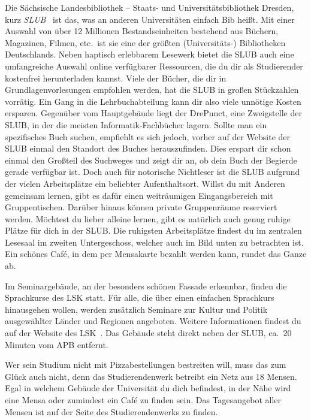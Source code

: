 \label{sec:slub}
Die Sächsische Landesbibliothek – Staats- und Universitätsbibliothek Dresden, kurz \emph{SLUB}~ ist das, was an anderen Universitäten einfach Bib heißt.
Mit einer Auswahl von über 12 Millionen Bestandseinheiten bestehend aus Büchern, Magazinen, Filmen, etc.\ ist sie eine der größten (Universitäts-) Bibliotheken Deutschlands.
Neben haptisch erlebbarem Lesewerk bietet die SLUB auch eine umfangreiche Auswahl online verfügbarer Ressourcen, die du dir als Studierender kostenfrei herunterladen kannst.
Viele der Bücher, die dir in Grundlagenvorlesungen empfohlen werden, hat die SLUB in großen Stückzahlen vorrätig. Ein Gang in die Lehrbuchabteilung kann dir also viele unnötige Kosten ersparen.
Gegenüber vom Hauptgebäude liegt der DrePunct, eine Zweigstelle der SLUB, in der die meisten Informatik-Fachbücher lagern. Sollte man ein spezifisches Buch suchen, empfiehlt es sich jedoch, vorher auf der Website der
SLUB einmal den Standort des Buches herauszufinden. Dies erspart dir schon einmal den Großteil des Suchweges und zeigt dir an, ob dein Buch der Begierde gerade verfügbar ist.\newline
Doch auch für notorische Nichtleser ist die SLUB aufgrund der vielen Arbeitsplätze ein beliebter Aufenthaltsort.
Willst du mit Anderen gemeinsam lernen, gibt es dafür einen weiträumigen Eingangsbereich mit Gruppentischen.
Darüber hinaus können private Gruppenräume reserviert werden. Möchtest du lieber alleine lernen, gibt es natürlich auch genug ruhige Plätze für dich in der SLUB\@. Die ruhigsten Arbeitsplätze findest du im zentralen Lesesaal
im zweiten Untergeschoss, welcher auch im Bild unten zu betrachten ist. Ein schönes Café, in dem per Mensakarte bezahlt werden kann, rundet das Ganze ab.

\newpage
{}
Im Seminargebäude, an der besonders schönen Fassade erkennbar, finden die Sprachkurse des LSK statt.
Für alle, die über einen einfachen Sprachkurs hinausgehen wollen, werden zusätzlich Seminare zur Kultur und Politik ausgewählter Länder und Regionen angeboten.
Weitere Informationen findest du auf der Website des LSK~.
Das Gebäude steht direkt neben der SLUB, ca.\ 20 Minuten vom APB entfernt.

Wer sein Studium nicht mit Pizzabestellungen bestreiten will, muss das zum Glück auch nicht, denn das Studierendenwerk betreibt ein Netz aus 18 Mensen.
Egal in welchem Gebäude der Universität du dich befindest, in der Nähe wird eine Mensa oder zumindest ein Café zu finden sein.
Das Tagesangebot aller Mensen ist auf der Seite des Studierendenwerks  zu finden.

